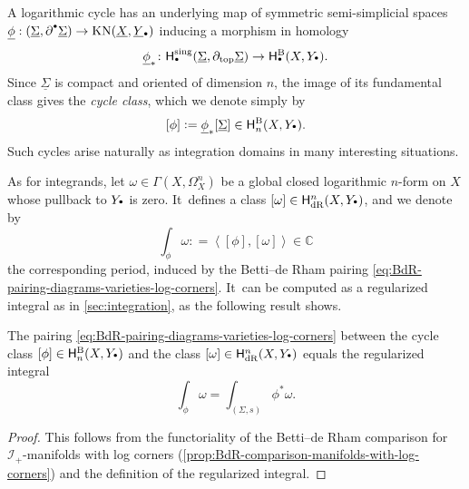 \documentclass[10pt]{amsart}
\let\oldbullet\bullet
\renewcommand{\bullet}{{\raisebox{1pt}{$\scriptscriptstyle\oldbullet$}}}
\theoremstyle{definition}
\theoremstyle{remark}
\let\defn\emph
\newcommand{\CC}{\mathbb{C}}
\newcommand{\defas}{\mathrel{\mathop:}=}
\newcommand{\abrac}[1]{\left\langle#1\right\rangle}
\newcommand{\Sig}{\Sigma}
\newcommand{\uSig}{\underline{\Sigma}}
\newcommand{\uphi}{\underline{\phi}}
\newcommand{\uX}{\underline{X}}
\newcommand{\uY}{\underline{Y}}
\newcommand{\KN}[1]{\mathrm{KN}(#1)}
\newcommand{\sect}[1]{\mathsf{\Gamma}(#1)}
\newcommand{\HdR}[2][\bullet]{\mathsf{H}_{\mathrm{dR}}^{#1}(#2)}
\newcommand{\HlgyB}[2][\bullet]{\mathsf{H}^{\mathrm{B}}_{#1}(#2)}
\newcommand{\ascat}{\mathscr{I}_+}
\begin{document}
A logarithmic cycle has an underlying map of symmetric semi-simplicial spaces $\uphi:(\uSig,\partial^\bullet\uSig) \to \KN{\uX,\uY_\bullet}$ inducing a morphism in homology
\[
\underline{\phi}_* \colon \mathsf{H}^{\mathrm{sing}}_\bullet(\uSig,\partial_{\mathrm{top}}\uSig) \to \HlgyB{X,Y_\bullet}.
\]
Since $\uSig$ is compact and oriented of dimension $n$, the image of its fundamental class gives the \defn{cycle class}, which we denote simply by
\[
[\phi] \defas \uphi_*[\uSig] \in \HlgyB[n]{X,Y_\bullet}.
\]
Such cycles arise naturally as integration domains in many interesting situations.

As for integrands, let $\omega\in \sect{X,\Omega^n_X}$ be a global closed logarithmic $n$-form on $X$ whose pullback to $Y_\bullet$ is zero. It~defines a class $[\omega]\in\HdR[n]{X,Y_\bullet}$, and we denote by
\[
\int_\phi \omega \defas \abrac{[\phi],[\omega]} \in \CC
\]
the corresponding period, induced by the Betti--de Rham pairing \eqref{eq:BdR-pairing-diagrams-varieties-log-corners}. It~can be computed as a regularized integral as in \autoref{sec:integration}, as the following result shows.

\begin{proposition}\label{prop:how-to-compute-log-periods}
The pairing \eqref{eq:BdR-pairing-diagrams-varieties-log-corners} between the cycle class $[\phi]\in\HlgyB[n]{X,Y_\bullet}$ and the class $[\omega]\in \HdR[n]{X,Y_\bullet}$ equals the regularized integral
\[
\int_\phi \omega = \int_{(\Sig,s)}\phi^*\omega.
\]
\end{proposition}

\begin{proof}
This follows from the functoriality of the Betti--de Rham comparison for $\ascat$-manifolds with log corners (\autoref{prop:BdR-comparison-manifolds-with-log-corners}) and the definition of the regularized integral.
\end{proof}
\end{document}
